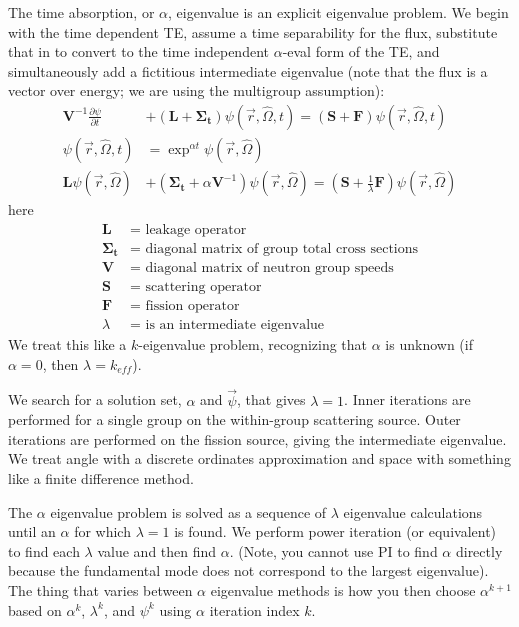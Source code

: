 \documentclass[12pt,twoside]{article}
\newcommand{\vOmega}{\ensuremath{\hat{\Omega}}}
\newcommand{\ve}[1]{\ensuremath{\mathbf{#1}}}
\begin{document}
The time absorption, or $\alpha$, eigenvalue is an explicit eigenvalue problem. 
We begin with the time dependent TE, assume a time separability for the flux, substitute that in to convert to the time independent $\alpha$-eval form of the TE, and simultaneously add a fictitious intermediate eigenvalue (note that the flux is a vector over energy; we are using the multigroup assumption):
\begin{align*}
\ve{V}^{-1} \frac{\partial \psi}{\partial t} &+ (\ve{L} + \ve{\Sigma_t}) \psi(\vec{r}, \vOmega, t) = (\ve{S} + \ve{F})\psi(\vec{r}, \vOmega, t)\\
\psi(\vec{r}, \vOmega, t) &= \exp^{\alpha t} \psi(\vec{r}, \vOmega)\\
%
\ve{L} \psi(\vec{r}, \vOmega) &+ (\ve{\Sigma_t} + \alpha \ve{V}^{-1}) \psi(\vec{r}, \vOmega) = (\ve{S} + \frac{1}{\lambda}\ve{F}) \psi(\vec{r}, \vOmega)
\end{align*}
%
here
\begin{align*}
\ve{L} &=\text{ leakage operator}\\
\ve{\Sigma_t} &=\text{ diagonal matrix of group total cross sections}\\
\ve{V} &=\text{ diagonal matrix of neutron group speeds}\\
\ve{S} &=\text{ scattering operator}\\
\ve{F} &=\text{ fission operator}\\
\lambda &=\text{ is an intermediate eigenvalue}
\end{align*}
We treat this like a $k$-eigenvalue problem, recognizing that $\alpha$ is unknown (if $\alpha=0$, then $\lambda = k_{eff}$). 

We search for a solution set, $\alpha$ and $\vec{\psi}$, that gives $\lambda = 1$.
Inner iterations are performed for a single group on the within-group scattering source.
Outer iterations are performed on the fission source, giving the intermediate eigenvalue.
We treat angle with a discrete ordinates approximation and space with something like a finite difference method. 

The $\alpha$ eigenvalue problem is solved as a sequence of $\lambda$ eigenvalue calculations until an $\alpha$ for which $\lambda = 1$ is found. 
We perform power iteration (or equivalent) to find each $\lambda$ value and then find $\alpha$. 
(Note, you cannot use PI to find $\alpha$ directly because the fundamental mode does not correspond to the largest eigenvalue).
The thing that varies between $\alpha$ eigenvalue methods is how you then choose $\alpha^{k+1}$ based on $\alpha^k$, $\lambda^k$, and $\psi^k$ using $\alpha$ iteration index $k$.
\end{document}
